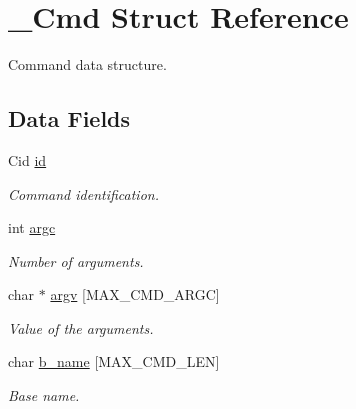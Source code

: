 \hypertarget{struct__Cmd}{}\section{\+\_\+\+Cmd Struct Reference}
\label{struct__Cmd}


Command data structure.  


\subsection*{Data Fields}
\begin{DoxyCompactItemize}
\item 
\mbox{\label{struct__Cmd_a106b2045967078710623e3a5f401dde2}} 
Cid \hyperlink{struct__Cmd_a106b2045967078710623e3a5f401dde2}{id}
\begin{DoxyCompactList}\small\item\em Command identification. \end{DoxyCompactList}\item 
\mbox{\label{struct__Cmd_af56ffa5c8c8f19251b15dc02a7eb352d}} 
int \hyperlink{struct__Cmd_af56ffa5c8c8f19251b15dc02a7eb352d}{argc}
\begin{DoxyCompactList}\small\item\em Number of arguments. \end{DoxyCompactList}\item 
\mbox{\label{struct__Cmd_aaaa6f539ab5219743163ecb74138fe7a}} 
char $\ast$ \hyperlink{struct__Cmd_aaaa6f539ab5219743163ecb74138fe7a}{argv} \mbox{[}M\+A\+X\+\_\+\+C\+M\+D\+\_\+\+A\+R\+GC\mbox{]}
\begin{DoxyCompactList}\small\item\em Value of the arguments. \end{DoxyCompactList}\item 
\mbox{\label{struct__Cmd_adb97870a775bf9f9075d44420cb82439}} 
char \hyperlink{struct__Cmd_adb97870a775bf9f9075d44420cb82439}{b\+\_\+name} \mbox{[}M\+A\+X\+\_\+\+C\+M\+D\+\_\+\+L\+EN\mbox{]}
\begin{DoxyCompactList}\small\item\em Base name. \end{DoxyCompactList}\item 
\mbox{\label{struct__Cmd_ac7a8c09e258cb2b2f63d179943616d08}} 

\end{DoxyCompactItemize}
